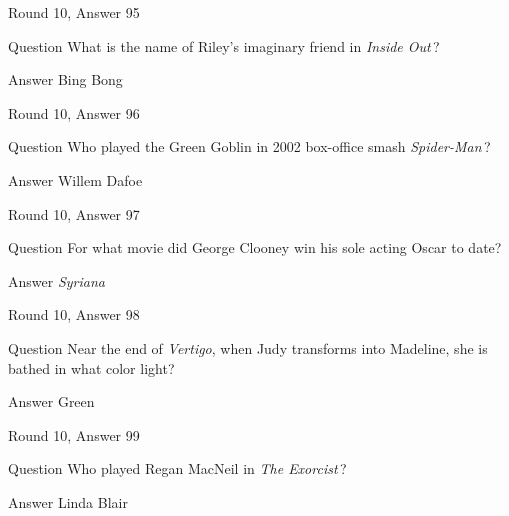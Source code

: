 \documentclass[11pt]{beamer}
\begin{document}
\begin{frame}[t]{Round 10, Answer 95}
\vspace{2em}
\begin{block}{Question}
What is the name of Riley's imaginary friend in \emph{Inside Out}\,?
\end{block}
\pause{}
\begin{block}{Answer}
Bing Bong
\end{block}
\end{frame}
    

\begin{frame}[t]{Round 10, Answer 96}
\vspace{2em}
\begin{block}{Question}
Who played the Green Goblin in 2002 box-office smash \emph{Spider-Man}\,?
\end{block}
\pause{}
\begin{block}{Answer}
Willem Dafoe
\end{block}
\end{frame}
    

\begin{frame}[t]{Round 10, Answer 97}
\vspace{2em}
\begin{block}{Question}
For what movie did George Clooney win his sole acting Oscar to date?
\end{block}
\pause{}
\begin{block}{Answer}
\emph{Syriana}
\end{block}
\end{frame}
    

\begin{frame}[t]{Round 10, Answer 98}
\vspace{2em}
\begin{block}{Question}
Near the end of \emph{Vertigo}, when Judy transforms into Madeline, she is bathed in what color light?
\end{block}
\pause{}
\begin{block}{Answer}
Green
\end{block}
\end{frame}
    

\begin{frame}[t]{Round 10, Answer 99}
\vspace{2em}
\begin{block}{Question}
Who played Regan MacNeil in \emph{The Exorcist}\,?
\end{block}
\pause{}
\begin{block}{Answer}
Linda Blair
\end{block}
\end{frame}
    
\end{document}
